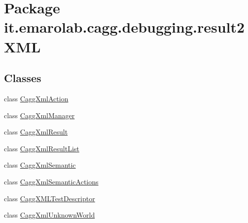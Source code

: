 \hypertarget{namespaceit_1_1emarolab_1_1cagg_1_1debugging_1_1result2XML}{\section{Package it.\-emarolab.\-cagg.\-debugging.\-result2\-X\-M\-L}
\label{namespaceit_1_1emarolab_1_1cagg_1_1debugging_1_1result2XML}
}
\subsection*{Classes}
\begin{DoxyCompactItemize}
\item 
class \hyperlink{classit_1_1emarolab_1_1cagg_1_1debugging_1_1result2XML_1_1CaggXmlAction}{Cagg\-Xml\-Action}
\item 
class \hyperlink{classit_1_1emarolab_1_1cagg_1_1debugging_1_1result2XML_1_1CaggXmlManager}{Cagg\-Xml\-Manager}
\item 
class \hyperlink{classit_1_1emarolab_1_1cagg_1_1debugging_1_1result2XML_1_1CaggXmlResult}{Cagg\-Xml\-Result}
\item 
class \hyperlink{classit_1_1emarolab_1_1cagg_1_1debugging_1_1result2XML_1_1CaggXmlResultList}{Cagg\-Xml\-Result\-List}
\item 
class \hyperlink{classit_1_1emarolab_1_1cagg_1_1debugging_1_1result2XML_1_1CaggXmlSemantic}{Cagg\-Xml\-Semantic}
\item 
class \hyperlink{classit_1_1emarolab_1_1cagg_1_1debugging_1_1result2XML_1_1CaggXmlSemanticActions}{Cagg\-Xml\-Semantic\-Actions}
\item 
class \hyperlink{classit_1_1emarolab_1_1cagg_1_1debugging_1_1result2XML_1_1CaggXMLTestDescriptor}{Cagg\-X\-M\-L\-Test\-Descriptor}
\item 
class \hyperlink{classit_1_1emarolab_1_1cagg_1_1debugging_1_1result2XML_1_1CaggXmlUnknownWorld}{Cagg\-Xml\-Unknown\-World}
\end{DoxyCompactItemize}
